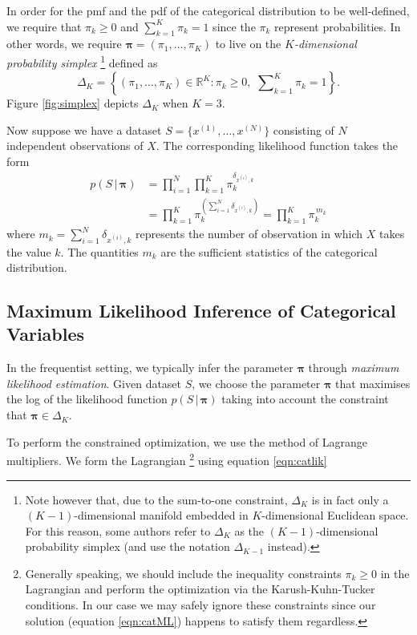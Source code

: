 \documentclass[final,3p,times,twocolumn]{elsarticle}
\let\bs\boldsymbol
\begin{document}
In order for the pmf and the pdf of the categorical distribution to be well-defined, we require that $\pi_k \geq 0$ and $\sum_{k=1}^K \pi_k = 1$ since the $\pi_k$ represent probabilities.
In other words, we require $\bs \pi = (\pi_1,\dots,\pi_K)$ to live on the \emph{$K$-dimensional probability simplex}
\footnote{Note however that, due to the sum-to-one constraint, $\Delta_K$ is in fact only a $(K-1)$-dimensional manifold embedded in $K$-dimensional Euclidean space.
For this reason, some authors refer to $\Delta_K$ as the $(K-1)$-dimensional probability simplex (and use the notation $\Delta_{K-1}$ instead).}
defined as
\begin{equation}
\label{eqn:simplex}
\Delta_K = \left\{(\pi_1,\dots,\pi_K) \in \mathbb{R}^K : \pi_k \geq 0,\,\, \sum \nolimits _{k=1}^K \pi_k = 1\right\}.
\end{equation}
Figure \ref{fig:simplex} depicts $\Delta_K$ when $K=3$.

Now suppose we have a dataset $S=\{ x^{(1)},\dots,x^{(N)} \}$ consisting of $N$ independent observations of $X$.
The corresponding likelihood function takes the form
\begin{equation}
\label{eqn:catlik}
\begin{split}
p(S\,|\,\bs \pi) &= \prod_{i=1}^N \prod_{k=1}^K \pi_k^{\delta_{x^{(i)},k}} \\ &= \prod_{k=1}^K \pi_k^{\left(\sum_{i=1}^N \delta_{x^{(i)},k}\right)} = \prod_{k=1}^K \pi_k^{\,m_k}
\end{split}
\end{equation}
where $m_k = \sum_{i=1}^N \delta_{x^{(i)}, k}$ represents the number of observation in which $X$ takes the value $k$.
The quantities $m_k$ are the sufficient statistics of the categorical distribution.

\subsection{Maximum Likelihood Inference of Categorical Variables}
In the frequentist setting, we typically infer the parameter $\bs \pi$ through \emph{maximum likelihood estimation}.
Given dataset $S$, we choose the parameter $\bs \pi$ that maximises the log of the likelihood function $p(S\,|\,\bs \pi)$ taking into account the constraint that $\bs \pi \in \Delta_K$.

To perform the constrained optimization, we use the method of Lagrange multipliers. We form the Lagrangian
\footnote{Generally speaking, we should include the inequality constraints $\pi_k \geq 0$ in the Lagrangian and perform the optimization via the Karush-Kuhn-Tucker conditions.
In our case we may safely ignore these constraints since our solution (equation \ref{eqn:catML}) happens to satisfy them regardless.}
using equation \ref{eqn:catlik}
\end{document}
